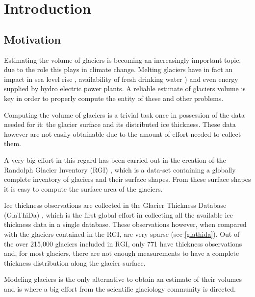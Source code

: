 \chapter{Introduction}\label{chap1}
\thispagestyle{plain}

\section{Motivation}\label{motivation}
Estimating the volume of glaciers is becoming an increasingly important topic, due to the role this plays in climate change. Melting glaciers have in fact an impact in sea level rise \citep{Zemp2017}, availability of fresh drinking water \citep{Kaser2010}) and even energy supplied by hydro electric power plants\citep{Terrier2011}. A reliable estimate of glaciers volume is key in order to properly compute the entity of these and other problems.

Computing the volume of glaciers is a trivial task once in possession of the data needed for it: the glacier surface and its distributed ice thickness. These data however are not easily obtainable due to the amount of effort needed to collect them.

A very big effort in this regard has been carried out in the creation of the Randolph Glacier Inventory (RGI) \citep{RGI2014}, which is a data-set containing a globally complete inventory of glaciers and their surface shapes. From these surface shapes it is easy to compute the surface area of the glaciers.

Ice thickness observations are collected in the Glacier Thickness Database (GlaThiDa) \citep{GlaThiDa2014}, which is the first global effort in collecting all the available ice thickness data in a single database. These observations however, when compared with the glaciers contained in the RGI, are very sparse (see \ref{glathida}). Out of the over 215,000 glaciers included in RGI, only 771 have thickness observations and, for most glaciers, there are not enough measurements to have a complete thickness distribution along the glacier surface. 

Modeling glaciers is the only alternative to obtain an estimate of their volumes and is where a big effort from the scientific glaciology community is directed.
  


